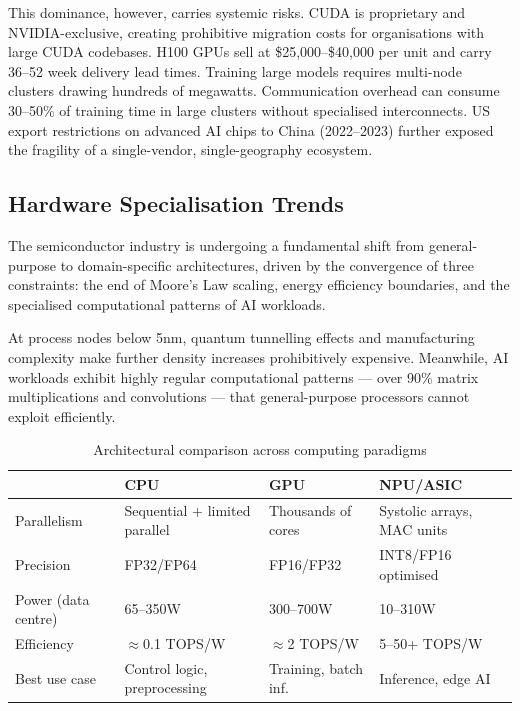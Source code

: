 This dominance, however, carries systemic risks. CUDA is proprietary and
NVIDIA-exclusive, creating prohibitive migration costs for organisations with
large CUDA codebases. H100 GPUs sell at \$25,000–\$40,000 per unit and carry
36–52 week delivery lead times. Training large models requires
multi-node clusters drawing hundreds of megawatts. Communication overhead can
consume 30–50\% of training time in large clusters without specialised
interconnects. US export restrictions on advanced AI chips to China (2022–2023)
further exposed the fragility of a single-vendor, single-geography ecosystem.

\subsection{Hardware Specialisation Trends}
\label{subsec:hw-specialisation}

The semiconductor industry is undergoing a fundamental shift from
general-purpose to domain-specific architectures, driven by the convergence
of three constraints: the end of Moore's Law scaling, energy efficiency
boundaries, and the specialised computational patterns of AI workloads.

At process nodes below 5nm, quantum tunnelling effects and manufacturing
complexity make further density increases prohibitively expensive. Meanwhile,
AI workloads exhibit highly regular computational patterns — over 90\%
matrix multiplications and convolutions — that general-purpose processors
cannot exploit efficiently.

\begin{table}[htbp]
  \centering
  \caption{Architectural comparison across computing paradigms}
  \label{tab:arch-comparison}
  \begin{tabularx}{\textwidth}{lXXX}
    \toprule
    \tableheader{Criterion & CPU & GPU & NPU/ASIC} \\
    \midrule
    Parallelism   & Sequential + limited parallel & Thousands of cores  & Systolic arrays, MAC units \\
    \rowcolor{TableRowOdd}
    Precision     & FP32/FP64                    & FP16/FP32           & INT8/FP16 optimised \\
    Power (data centre) & 65–350W               & 300–700W            & 10–310W \\
    \rowcolor{TableRowOdd}
    Efficiency    & $\approx$0.1 TOPS/W          & $\approx$2 TOPS/W   & 5–50+ TOPS/W \\
    Best use case & Control logic, preprocessing & Training, batch inf. & Inference, edge AI \\
    \bottomrule
  \end{tabularx}
\end{table}

